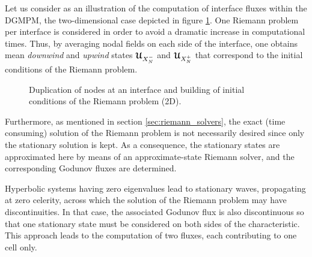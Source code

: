 Let us consider as an illustration of the computation of interface fluxes within the DGMPM, the two-dimensional case depicted in figure \ref{fig:2D_edge}.
One Riemann problem per interface is considered in order to avoid a dramatic increase in computational times.
Thus, by averaging nodal fields on each side of the interface, one obtains mean \textit{downwind} and \textit{upwind} states ${\boldsymbol{\mathcal{U}}}_{X_N^-}$ and ${\boldsymbol{\mathcal{U}}}_{X_N^+}$ that correspond to the initial conditions of the Riemann problem.
\begin{figure}[h!]
  \centering
  
  \caption{Duplication of nodes at an interface and building of initial conditions of the Riemann problem (2D).}
  \label{fig:2D_edge}
\end{figure}
Furthermore, as mentioned in section \ref{sec:riemann_solvers}, the exact (time consuming) solution of the Riemann problem is not necessarily desired since only the stationary solution is kept. As a consequence, the stationary states are approximated here by means of an approximate-state Riemann solver, and the corresponding Godunov fluxes are determined.
\begin{remark}
  Hyperbolic systems having zero eigenvalues lead to stationary waves, propagating at zero celerity, across which the solution of the Riemann problem may have discontinuities. In that case, the associated Godunov flux is also discontinuous so that one stationary state must be considered on both sides of the characteristic. This approach leads to the computation of two fluxes, each contributing to one cell only. 
\end{remark}

